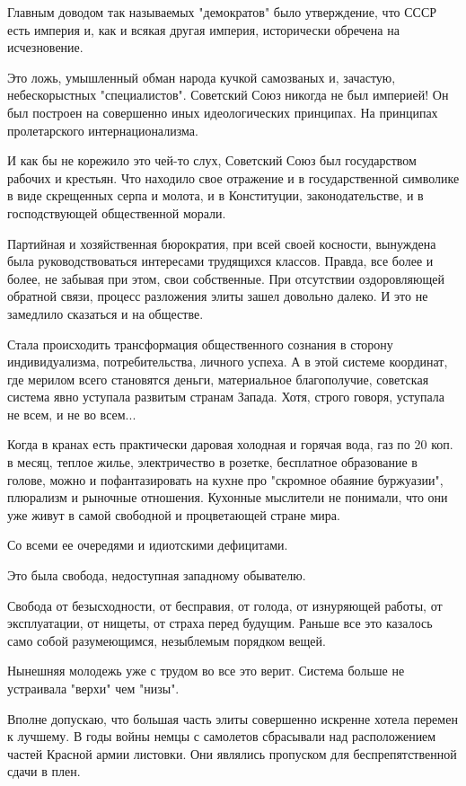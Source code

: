 Главным доводом так называемых "демократов" было утверждение, что СССР есть
империя и, как и всякая другая империя, исторически обречена на исчезновение.

Это ложь, умышленный обман народа кучкой самозваных и, зачастую, небескорыстных
"специалистов". Советский Союз никогда не был империей! Он был построен на
совершенно иных идеологических принципах. На принципах пролетарского
интернационализма.

И как бы не корежило это чей-то слух, Советский Союз был государством рабочих и
крестьян.  Что находило свое отражение и в государственной символике в виде
скрещенных серпа и молота, и в Конституции, законодательстве, и в
господствующей общественной морали.

Партийная и хозяйственная бюрократия, при всей своей косности, вынуждена была
руководствоваться интересами трудящихся классов. Правда, все более и более, не
забывая при этом, свои собственные. При отсутствии оздоровляющей обратной
связи, процесс разложения элиты зашел довольно далеко. И это не замедлило
сказаться и на обществе.

Стала происходить трансформация общественного сознания в сторону
индивидуализма, потребительства, личного успеха. А в этой системе координат,
где мерилом всего становятся деньги, материальное благополучие, советская
система явно уступала развитым странам Запада. Хотя, строго говоря, уступала не
всем, и не во всем...

Когда в кранах есть практически даровая холодная и горячая вода, газ по 20 коп.
в месяц, теплое жилье, электричество в розетке, бесплатное образование в
голове, можно и пофантазировать на кухне про "скромное обаяние буржуазии",
плюрализм и рыночные отношения. Кухонные мыслители не понимали, что они уже
живут в самой свободной и процветающей стране мира.

Со всеми ее очередями и идиотскими дефицитами.

Это была свобода, недоступная западному обывателю.

Свобода от безысходности, от бесправия, от голода, от изнуряющей работы, от
эксплуатации, от нищеты, от страха перед будущим. Раньше все это казалось само
собой разумеющимся, незыблемым порядком вещей.

Нынешняя молодежь уже с трудом во все это верит. Система больше не устраивала
"верхи" чем "низы".

Вполне допускаю, что большая часть элиты совершенно искренне хотела перемен к
лучшему. В годы войны немцы с самолетов сбрасывали над расположением частей
Красной армии листовки. Они являлись пропуском для беспрепятственной сдачи в
плен.

